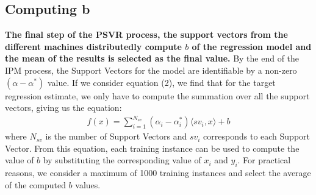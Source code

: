 \documentclass[12pt]{article}
\begin{document}
\subsection{Computing b}
\label{Comuting B}
  {\bf The final step of the PSVR process, the support vectors from the different machines distributedly compute $b$ of the regression model and the mean of the results is selected as the final value.}
  \newline\newline
By the end of the IPM process, the Support Vectors for the model are identifiable by a non-zero $(\alpha - \alpha^*)$ value. If we consider equation (2), we find that for the target regression estimate, we only have to compute the summation over all the support vectors, giving us the equation:
\begin{gather*}
f(x) = \sum_{i=1}^{N_{sv}}{(\alpha_{i} - \alpha^*_{i}) \langle sv_{i}, x \rangle} + b
\end{gather*}
where $N_{sv}$ is the number of Support Vectors and $sv_{i}$ corresponds to each Support Vector. From this equation, each training instance can be used to compute the value of $b$ by substituting the corresponding value of $x_{i}$ and $y_{i}$.
\newline For practical reasons, we consider a maximum of 1000 training instances and select the average of the computed $b$ values.
\cleardoublepage
\end{document}
